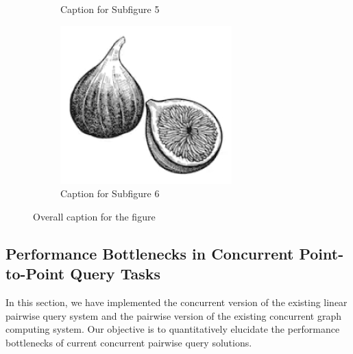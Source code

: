 \documentclass[lettersize,journal]{IEEEtran} %
\begin{document}
\begin{figure}[!t]
\begin{subfigure}{0.3\columnwidth}
      \caption{Caption for Subfigure 5}
      \label{fig:subfig5}
    \end{subfigure}
    \hfill
    \begin{subfigure}{0.3\columnwidth}
      \includegraphics[width=\linewidth]{fig1.png}
      \caption{Caption for Subfigure 6}
      \label{fig:subfig6}
    \end{subfigure}
  
    \caption{Overall caption for the figure}
    \label{fig:overall}
  \end{figure}
  
  

\subsection{Performance Bottlenecks in Concurrent Point-to-Point Query Tasks}
In this section, we have implemented the concurrent version of the existing linear pairwise query system and the pairwise version of the existing concurrent graph computing system. Our objective is to quantitatively elucidate the performance bottlenecks of current concurrent pairwise query solutions.
\end{document}
